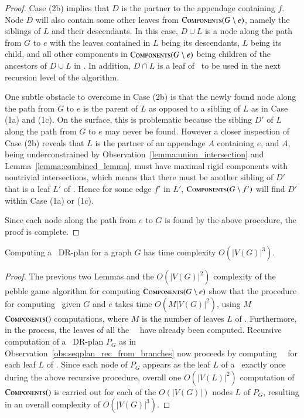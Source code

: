 \begin{proof}
    Case (2b) implies that $D$ is the partner to the appendage containing $f$. Node $D$ will also contain some other leaves from $\textsc{Components}(G\setminus e)$, namely the siblings of $L$ and their descendants. In this case, $D\cup L$ is a node along the path from $G$ to $e$ with the leaves contained in $L$ being its descendants, $L$ being its child, and all other components in $\textsc{Components}(G\setminus e)$ being children of the ancestors of $D\cup L$ in \branchGePG. In addition, $D\cap L$ is a leaf of \branchLfPL\ to be used in the next recursion level of the algorithm.

    One subtle obstacle to overcome in Case (2b) is that the newly found node along the path from $G$ to $e$ is the parent of $L$ as opposed to a sibling of $L$ as in Case (1a) and (1c). On the surface, this is problematic because the sibling $D'$ of $L$ along the path from $G$ to $e$ may never be found. However a closer inspection of Case (2b) reveals that $L$ is the partner of an appendage $A$ containing $e$, and $A$, being underconstrained by Observation~\ref{lemma:union_intersection} and Lemma~\ref{lemma:combined_lemma}, must have maximal rigid components with nontrivial intersections, which means that there must be another sibling of $D'$ that is a leaf $L'$ of \branchGePG. Hence for some edge $f'$ in $L'$, $\textsc{Components}(G\setminus f')$ will find $D'$ within Case (1a) or (1c).

    Since each node along the path from $e$ to $G$ is found by the above procedure, the proof is complete.
\end{proof}


\begin{theorem}
\label{theorem:algo_complexity}
    Computing a \pseudosequential\ DR-plan for a graph $G$ has time complexity $O(|V(G)|^3)$.
\end{theorem}

\begin{proof}
    The previous two Lemmas and the $O(|V(G)|^2)$ complexity of the pebble game algorithm for computing $\textsc{Components}(G\setminus e)$ show that the procedure for computing \branchGePG\ given $G$ and $e$ takes time $O(M|V(G)|^2)$, using $M$ $\textsc{Components}()$ computations, where $M$ is the number of leaves $L$ of \branchGePG. Furthermore, in the process, the leaves of all the \branches\ \branchLfPL\ have already been computed. Recursive computation of a \pseudosequential\ DR-plan $P_G$ as in Observation~\ref{obs:seqplan_rec_from_branches} now proceeds by computing \branches\ \branchLfPL\ for each leaf $L$ of \branchGePG. Since each node of $P_G$ appears as the leaf $L$ of a \branch\ exactly once during the above recursive procedure, overall one $O(|V(L)|^2)$ computation of $\textsc{Components}()$ is carried out for each of the $O(|V(G)|)$ nodes $L$ of $P_G$, resulting in an overall complexity of $O(|V(G)|^3)$.
\end{proof}



